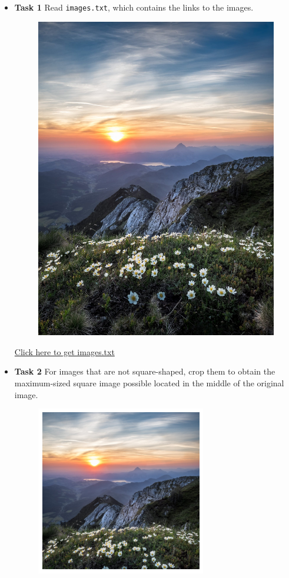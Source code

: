 \begin{itemize}
\item \textbf{Task 1} Read \verb|images.txt|, which contains the links to the images.
 \begin{figure}[H]
  \centering
  \includegraphics[scale=.088]{nature.jpeg}
  \end{figure}
  \href{https://ydjemmada.github.io/projects/images.txt}{Click here to get images.txt}
\item \textbf{Task 2} For images that are not square-shaped, crop them to obtain the maximum-sized square image possible located in the middle of the original image.
\begin{figure}[H]
\centering
\includegraphics[scale=.5]{image_croped.png}
\end{figure}


\end{itemize}
